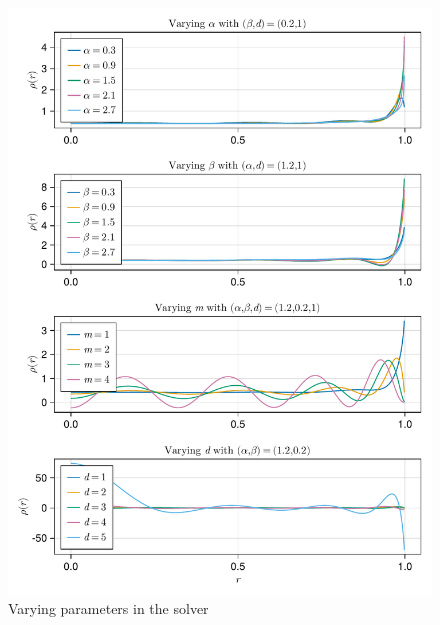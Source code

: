 \begin{figure}[H]
  \centering
  \label{fig:varying-parameters}
  \includegraphics[width=0.9\linewidth]{../figures/results/varying-parameters.pdf}
  \caption{Varying parameters in the solver}
\end{figure}

